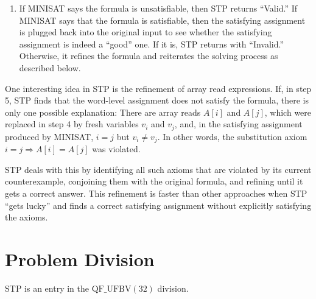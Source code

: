 \documentclass{article}
\begin{document}
\begin{enumerate}

\item If MINISAT says the formula is unsatisfiable, then STP returns
``Valid.'' If MINISAT says that the formula is satisfiable, then the
satisfying assignment is plugged back into the original input to see
whether the satisfying assignment is indeed a ``good'' one. If it is,
STP returns with ``Invalid.'' Otherwise, it refines the formula and
reiterates the solving process as described below.

\end{enumerate}

One interesting idea in STP is the refinement of array read
expressions. If, in step 5, STP finds that the word-level assignment
does not satisfy the formula, there is only one possible explanation:
There are array reads $A[i]$ and $A[j]$, which were replaced in step 4
by fresh variables $v_i$ and $v_j$, and, in the satisfying assignment
produced by MINISAT, $i = j$ but $v_i \not= v_j$.  In other words, the
substitution axiom $i = j \Rightarrow A[i] = A[j]$ was violated.

STP deals with this by identifying all such axioms that are violated
by its current counterexample, conjoining them with the original
formula, and refining until it gets a correct answer. This refinement
is faster than other approaches when STP ``gets lucky'' and finds a
correct satisfying assignment without explicitly satisfying the
axioms.


\section{Problem Division}
STP is an entry in the $\mathrm{QF\_UFBV(32)}$ division.



\end{document}
